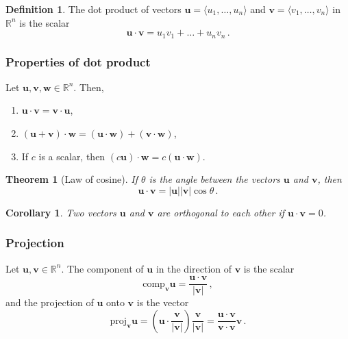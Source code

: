 \documentclass[
]{article}
\newtheorem{theorem}{Theorem}[section]
\newtheorem{corollary}{Corollary}[section]
\theoremstyle{definition}
\newtheorem{definition}{Definition}[section]
\theoremstyle{definition}
\theoremstyle{definition}
\theoremstyle{definition}
\theoremstyle{remark}
\begin{document}
\begin{definition}
The dot product of vectors \(\textbf{u} = \langle u_1, \dots, u_n \rangle\)
and \(\textbf{v} = \langle v_1, \dots, v_n \rangle\) in \(\mathbb{R}^n\) is the
scalar
\begin{equation*}
    \textbf{u} \cdot \textbf{v} = u_1 v_1 +\dots + u_n v_n \,.
\end{equation*}
\end{definition}

\subsubsection*{Properties of dot product}\label{properties-of-dot-product}

Let \(\textbf{u}, \textbf{v}, \textbf{w} \in \mathbb{R}^n\). Then,

\begin{enumerate}
\def\labelenumi{\arabic{enumi}.}
\item
  \(\textbf{u}\cdot \textbf{v} = \textbf{v}\cdot \textbf{u}\),
\item
  \((\textbf{u} + \textbf{v})\cdot \textbf{w} = (\textbf{u}\cdot \textbf{w}) + (\textbf{v}\cdot \textbf{w})\),
\item
  If \(c\) is a scalar, then \((c \textbf{u})\cdot \textbf{w} = c (\textbf{u}\cdot \textbf{w})\).
\end{enumerate}

\begin{theorem}[Law of cosine]
If \(\theta\) is the angle between the vectors \(\textbf{u}\) and \(\textbf{v}\), then
\begin{equation*}
        \textbf{u}\cdot \textbf{v} = |\textbf{u}|| \textbf{v}| \cos \theta \,.
   \end{equation*}
\end{theorem}

\begin{corollary}
Two vectors \(\textbf{u}\) and \(\textbf{v}\) are orthogonal to each other
if \(\textbf{u} \cdot \textbf{v} = 0\).
\end{corollary}

\subsubsection*{Projection}\label{projection}

Let \(\textbf{u}, \textbf{v}\in \mathbb{R}^n\). The component of \(\textbf{u}\)
in the direction of \(\textbf{v}\) is the scalar
\begin{equation*}
\mathrm{comp}_{\mathbf{v}}\mathbf{u} = \frac{\mathbf{u}\cdot \mathbf{v}}{|\mathbf{v}|} \,,
\end{equation*}
and the projection of \(\mathbf{u}\) onto \(\mathbf{v}\) is the vector
\begin{equation*}
    \mathrm{proj}_{\mathbf{v}}\mathbf{u} 
    =\left( \mathbf{u}\cdot \frac{\mathbf{v}}{|\mathbf{v}|}\right) \frac{\mathbf{v}}{|\mathbf{v}|} 
    = \frac{\mathbf{u}\cdot \mathbf{v}}{\mathbf{v} \cdot\mathbf{v}} \mathbf{v} \,.
\end{equation*}
\end{document}

